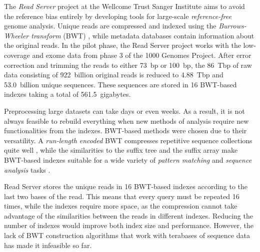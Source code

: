 \documentclass[smallabstract,smallcaptions]{dccpaper}
\newcommand{\BWT}{\textsf{BWT}}
\begin{document}
The \emph{Read Server} project at the Wellcome Trust Sanger Institute aims to avoid the reference bias entirely by developing tools for large-scale \emph{reference-free} genome analysis. Unique reads are compressed and indexed using the \emph{Burrows-Wheeler transform} (\BWT) \cite{Burrows1994}, while metadata databases contain information about the original reads. In the pilot phase, the Read Server project works with the low-coverage and exome data from phase 3 of the 1000 Genomes Project. After error correction and trimming the reads to either 73~bp or 100~bp, the 86~Tbp of raw data consisting of 922~billion original reads is reduced to 4.88~Tbp and 53.0~billion unique sequences. These sequences are stored in 16 \BWT-based indexes \cite{Ferragina2005a} taking a total of 561.5~gigabytes.

Preprocessing large datasets can take days or even weeks. As a result, it is not always feasible to rebuild everything when new methods of analysis require new functionalities from the indexes. \BWT-based methods were chosen due to their versatility. A \emph{run-length encoded} \BWT{} compresses repetitive sequence collections quite well \cite{Maekinen2010}, while the similarities to the suffix tree and the suffix array make \BWT-based indexes suitable for a wide variety of \emph{pattern matching} and \emph{sequence analysis} tasks \cite{Ohlebusch2013,Maekinen2015}.

Read Server stores the unique reads in 16 \BWT-based indexes according to the last two bases of the read. This means that every query must be repeated 16 times, while the indexes require more space, as the compression cannot take advantage of the similarities between the reads in different indexes. Reducing the number of indexes would improve both index size and performance. However, the lack of \BWT{} construction algorithms that work with terabases of sequence data has made it infeasible so far.
\end{document}

